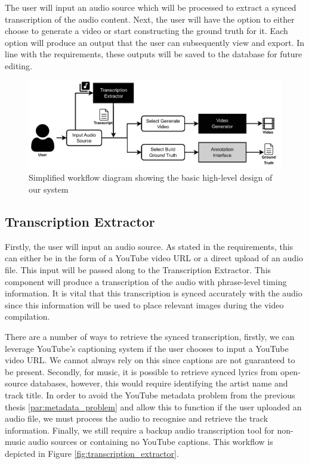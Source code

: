 \documentclass{l4proj}
\begin{document}
The user will input an audio source which will be processed to extract a synced transcription of the audio content. Next, the user will have the option to either choose to generate a video or start constructing the ground truth for it. Each option will produce an output that the user can subsequently view and export. In line with the requirements, these outputs will be saved to the database for future editing.

\begin{figure}[h]
    \centering
    \includegraphics[width=1\textwidth]{figures/simplified_architecture.pdf}
    \caption{Simplified workflow diagram showing the basic high-level design of our system}
    \label{fig:simplified_workflow}
\end{figure}

\subsection{Transcription Extractor}
Firstly, the user will input an audio source. As stated in the requirements, this can either be in the form of a YouTube video URL or a direct upload of an audio file. This input will be passed along to the Transcription Extractor. This component will produce a transcription of the audio with phrase-level timing information. It is vital that this transcription is synced accurately with the audio since this information will be used to place relevant images during the video compilation.

There are a number of ways to retrieve the synced transcription, firstly, we can leverage YouTube's captioning system if the user chooses to input a YouTube video URL. We cannot always rely on this since captions are not guaranteed to be present. Secondly, for music, it is possible to retrieve synced lyrics from open-source databases, however, this would require identifying the artist name and track title. In order to avoid the YouTube metadata problem from the previous thesis \ref{par:metadata_problem} and allow this to function if the user uploaded an audio file, we must process the audio to recognise and retrieve the track information. Finally, we still require a backup audio transcription tool for non-music audio sources or containing no YouTube captions. This workflow is depicted in Figure \ref{fig:transcription_extractor}.
\end{document}
